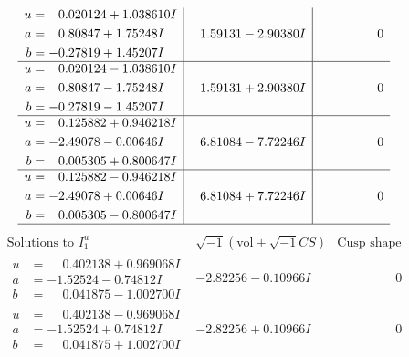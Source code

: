 \documentclass[1p]{elsarticle_modified}
\theoremstyle{definition}
\newcommand{\I}{\sqrt{-1}}
\begin{document}
$$\begin{array}{c|c|c}
\begin{aligned}
u &= \phantom{-}0.020124 + 1.038610 I \\
a &= \phantom{-}0.80847 + 1.75248 I \\
b &= -0.27819 + 1.45207 I\end{aligned}
 & \phantom{-}1.59131 - 2.90380 I & \phantom{-0.000000 } 0 \\ \hline\begin{aligned}
u &= \phantom{-}0.020124 - 1.038610 I \\
a &= \phantom{-}0.80847 - 1.75248 I \\
b &= -0.27819 - 1.45207 I\end{aligned}
 & \phantom{-}1.59131 + 2.90380 I & \phantom{-0.000000 } 0 \\ \hline\begin{aligned}
u &= \phantom{-}0.125882 + 0.946218 I \\
a &= -2.49078 - 0.00646 I \\
b &= \phantom{-}0.005305 + 0.800647 I\end{aligned}
 & \phantom{-}6.81084 - 7.72246 I & \phantom{-0.000000 } 0 \\ \hline\begin{aligned}
u &= \phantom{-}0.125882 - 0.946218 I \\
a &= -2.49078 + 0.00646 I \\
b &= \phantom{-}0.005305 - 0.800647 I\end{aligned}
 & \phantom{-}6.81084 + 7.72246 I & \phantom{-0.000000 } 0\\
 \hline 
 \end{array}$$\newpage$$\begin{array}{c|c|c}  
\text{Solutions to }I^u_{1}& \I (\text{vol} + \sqrt{-1}CS) & \text{Cusp shape}\\
 \hline 
\begin{aligned}
u &= \phantom{-}0.402138 + 0.969068 I \\
a &= -1.52524 - 0.74812 I \\
b &= \phantom{-}0.041875 - 1.002700 I\end{aligned}
 & -2.82256 - 0.10966 I & \phantom{-0.000000 } 0 \\ \hline\begin{aligned}
u &= \phantom{-}0.402138 - 0.969068 I \\
a &= -1.52524 + 0.74812 I \\
b &= \phantom{-}0.041875 + 1.002700 I\end{aligned}
 & -2.82256 + 0.10966 I & \phantom{-0.000000 } 0 \\ \hline\begin{aligned}

\end{aligned}
\end{array}$$
\end{document}

